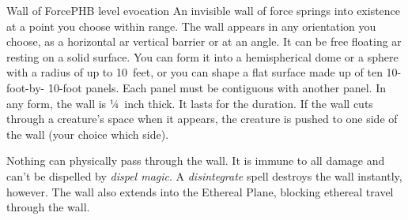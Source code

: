 \begin{spell}{Wall of Force}{PHB}{ level evocation}
{
}
An invisible wall of force springs into existence at a
point you choose within range. The wall appears in
any orientation you choose, as a horizontal ar vertical
barrier or at an angle. It can be free floating ar resting
on a solid surface. You can form it into a hemispherical
dome or a sphere with a radius of up to 10~feet, or you
can shape a flat surface made up of ten 10-foot-by-
10-foot panels. Each panel must be contiguous with
another panel. In any form, the wall is ¼~inch thick.
It lasts for the duration. If the wall cuts through a
creature's space when it appears, the creature is pushed
to one side of the wall (your choice which side).

Nothing can physically pass through the wall. It is
immune to all damage and can't be dispelled by \emph{dispel
magic}. A \emph{disintegrate} spell destroys the wall instantly,
however. The wall also extends into the Ethereal Plane,
blocking ethereal travel through the wall.
\end{spell}